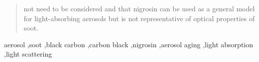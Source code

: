 \documentclass[12pt,authoryear]{elsarticle}
\begin{document}
\begin{frontmatter}
\begin{abstract}
not need to be considered and that nigrosin can be used as a general model for light-absorbing aerosols but is not representative of optical properties of soot.
\end{abstract}


\begin{keyword}
aerosol \sep soot \sep black carbon \sep carbon black \sep nigrosin \sep aerosol aging \sep light absorption \sep light scattering 
\end{keyword}

\end{frontmatter}

\renewcommand{\thefootnote}{\textit{\alph{footnote}}}

\end{document}
